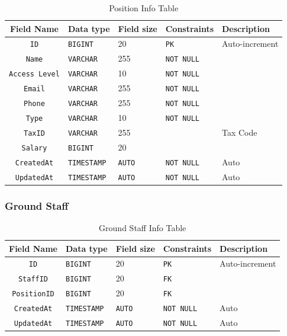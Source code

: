 \begin{table}[H]
	\centering
	\begin{tabular}{cllll}
		\hline
		Field Name & Data type & Field size & Constraints & Description \\ \hline
		\texttt{ID} & \texttt{BIGINT} & 20 & \texttt{PK} & Auto-increment \\
		\texttt{Name} & \texttt{VARCHAR} & 255 & \texttt{NOT NULL} &  \\
		\texttt{Access Level} & \texttt{VARCHAR} & 10 & \texttt{NOT NULL} &  \\
		\texttt{Email} & \texttt{VARCHAR} & 255 & \texttt{NOT NULL} &  \\
		\texttt{Phone} & \texttt{VARCHAR} & 255 & \texttt{NOT NULL} &  \\
		\texttt{Type} & \texttt{VARCHAR} & 10 & \texttt{NOT NULL} &  \\
		\texttt{TaxID} & \texttt{VARCHAR} & 255 & &  Tax Code\\
		\texttt{Salary} & \texttt{BIGINT} & 20 & &  \\
		
		\texttt{CreatedAt} & \texttt{TIMESTAMP} & \texttt{AUTO} & \texttt{NOT NULL} & Auto \\
		\texttt{UpdatedAt} & \texttt{TIMESTAMP} & \texttt{AUTO} & \texttt{NOT NULL} & Auto \\
		\hline
	\end{tabular}
	\caption{Position Info Table}
\end{table}

\subsubsection{Ground Staff}

\begin{table}[H]
	\centering
	\begin{tabular}{cllll}
		\hline
		Field Name & Data type & Field size & Constraints & Description \\ \hline
		\texttt{ID} & \texttt{BIGINT} & 20 & \texttt{PK} & Auto-increment \\
		\texttt{StaffID} & \texttt{BIGINT} & 20 & \texttt{FK} &  \\
		\texttt{PositionID} & \texttt{BIGINT} & 20 & \texttt{FK} &  \\
		
		\texttt{CreatedAt} & \texttt{TIMESTAMP} & \texttt{AUTO} & \texttt{NOT NULL} & Auto \\
		\texttt{UpdatedAt} & \texttt{TIMESTAMP} & \texttt{AUTO} & \texttt{NOT NULL} & Auto \\
		\hline
	\end{tabular}
	\caption{Ground Staff Info Table}
\end{table}

